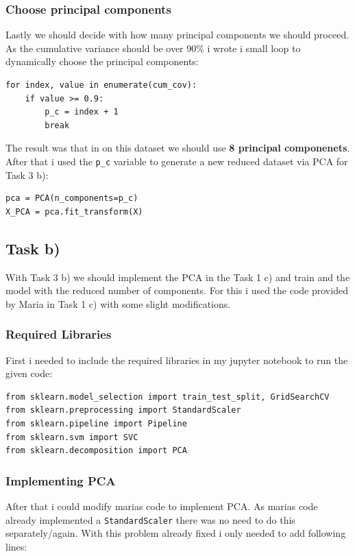 \subsubsection{Choose principal components}

Lastly we should decide with how many principal components we should proceed. As the cumulative variance should be over 90\% i wrote i small loop to dynamically choose the principal components:

\begin{verbatim}
for index, value in enumerate(cum_cov):
    if value >= 0.9:
        p_c = index + 1
        break
\end{verbatim}
The result was that in on this dataset we should use \textbf{8 principal componenets}. After that i used the \verb|p_c| variable to generate a new reduced dataset via PCA for Task 3 b):

\begin{verbatim}
pca = PCA(n_components=p_c)
X_PCA = pca.fit_transform(X)
\end{verbatim}

\subsection{Task b)}

With Task 3 b) we should implement the PCA in the Task 1 c) and train and the model with the reduced number of components. For this i used the code provided by Maria in Task 1 c) with some slight modifications.

\subsubsection{Required Libraries}

First i needed to include the required libraries in my jupyter notebook to run the given code:

\begin{verbatim}
from sklearn.model_selection import train_test_split, GridSearchCV
from sklearn.preprocessing import StandardScaler
from sklearn.pipeline import Pipeline
from sklearn.svm import SVC
from sklearn.decomposition import PCA
\end{verbatim}

\subsubsection{Implementing PCA}

After that i could modify marias code to implement PCA. As marias code already implemented a \verb|StandardScaler| there was no need to do this separately/again. With this problem already fixed i only needed to add following lines:

